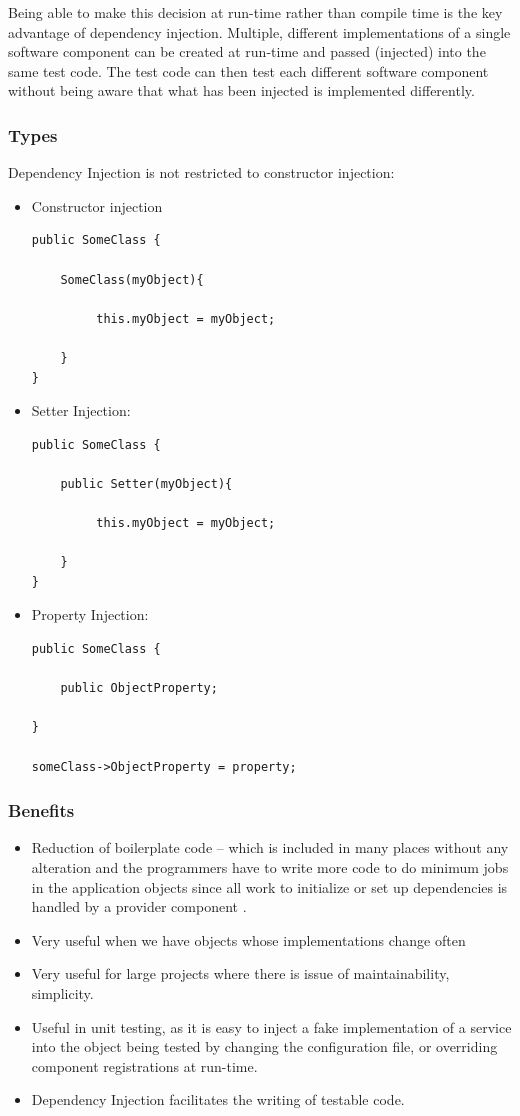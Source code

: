\documentclass[14pt,a4paper]{extreport}
\begin{document}
Being able to make this decision at run-time rather than compile time is the key advantage of dependency injection. Multiple, different implementations of a single software component can be created at run-time and passed (injected) into the same test code. The test code can then test each different software component without 
being aware that what has been injected is implemented differently.
			\subsubsection{Types}
			Dependency Injection is not restricted to constructor injection:

\begin{itemize}
\item Constructor injection
\begin{verbatim}
public SomeClass {

	SomeClass(myObject){
	
		 this.myObject = myObject;
		 
	}
}
\end{verbatim}
\item Setter Injection:
\begin{verbatim}
public SomeClass {

	public Setter(myObject){
	
		 this.myObject = myObject;
		 
	}
}
\end{verbatim}
\item  Property Injection:
\begin{verbatim}
public SomeClass {

	public ObjectProperty;
	
}

someClass->ObjectProperty = property;
\end{verbatim}
\end{itemize}
		\subsubsection{Benefits}
\begin{itemize}
\item Reduction of boilerplate code – which is included in many places without any alteration and the programmers have to write more code to do minimum jobs in the application objects since all work to initialize or set up dependencies is handled by a provider component . 
\item Very useful when we have objects whose implementations change often 
\item Very useful for large projects where there is issue of maintainability, simplicity.

\item Useful in unit testing, as it is easy to inject a fake implementation of a service into the object being tested by changing the configuration file, or overriding component registrations at run-time.

\item Dependency Injection facilitates the writing of testable code.
\end{itemize}
\end{document}
